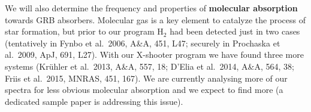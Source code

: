 \documentclass[iop, twocolappendix, numberedappendix, tighten, appendixfloats]{emulateapj}
\newcommand{\lya}{Ly$\alpha$}
\begin{document}
	
	
	
	\smallskip
	
	We will also determine the frequency and properties of {\bf molecular
		absorption} towards GRB absorbers. Molecular gas is a key element to catalyze
	the process of star formation, but prior to our program H$_2$ had been detected
	just in two cases (tentatively in Fynbo et al.\ 2006, A\&A, 451, L47; securely
	in Prochaska et al.\ 2009, ApJ, 691, L27). With our X-shooter program we have
	found three more systems (Kr\"uhler et al.\ 2013, A\&A, 557, 18; D'Elia et al.\
	2014, A\&A, 564, 38; Friis et al.\, 2015, MNRAS, 451, 167). 
	We are currently analysing more of our spectra for less obvious molecular
	absorption and we expect to find more (a dedicated sample paper is 
	addressing this issue).
	
\end{document}
